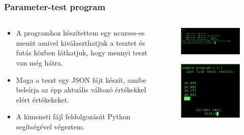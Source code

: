\documentclass{beamer}
\begin{document}
\begin{frame}
\frametitle{Parameter-test program}

\begin{columns}
\begin{column}{0.5\textwidth}
\begin{itemize}
\item A programhoz készítettem egy ncurses-es menüt amivel kiválaszthatjuk a tesztet és futás közben láthatjuk, hogy mennyi teszt van még hátra.
\item Maga a teszt egy JSON fájt készít, amibe beleírja az épp aktuális változó értékekkel elért értékekeket.
\item A kimeneti fájl feldolgozását Python segítségével végeztem. 
\end{itemize}
\end{column}

\begin{column}{0.5\textwidth}
\begin{figure}
\begin{center}
\includegraphics[width=\textwidth]{images/parameter-test-select.png}
\end{center}		
\end{figure}

\begin{figure}
\begin{center}
\includegraphics[height=0.3\textheight]{images/parameter-test.png}
\end{center}	
\end{figure}
\end{column}

\end{columns}
\end{frame}
\end{document}
